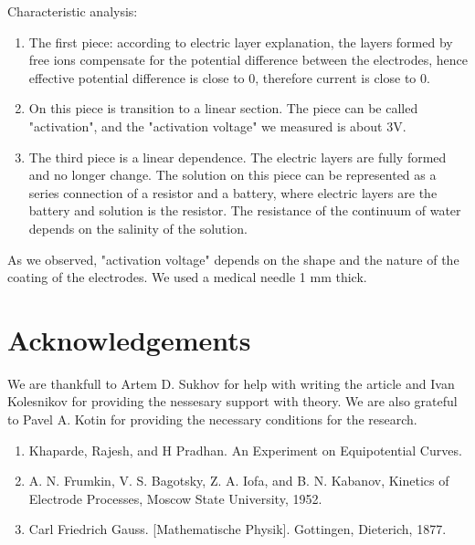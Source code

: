 \documentclass{article}
\begin{document}
Characteristic analysis:
\begin{enumerate}   
\item The first piece: according to electric layer explanation, the layers formed by free ions compensate for the potential difference between the electrodes, hence effective potential difference is close to 0, therefore current is close to 0.

\item On this piece is transition to a linear section. The piece can be called "activation", and the "activation voltage" we measured is about 3V.

\item The third piece is a linear dependence. The electric layers are fully formed and no longer change. The solution on this piece can be represented as a series connection of a resistor and a battery, where electric layers are the battery and solution is the resistor. The resistance of the continuum of water depends on the salinity of the solution.
\end{enumerate}

As we observed, "activation voltage" depends on the shape and the nature of the coating of the electrodes. We used a medical needle 1 mm thick.


\section{Acknowledgements}
We are thankfull to Artem D. Sukhov for help with writing the article and Ivan Kolesnikov for providing the nessesary support with theory. We are also grateful to Pavel A. Kotin for providing the necessary conditions for the research.



  
  
\begin{enumerate}
\item Khaparde, Rajesh, and H Pradhan. An Experiment on Equipotential Curves.
\item A. N. Frumkin, V. S. Bagotsky, Z. A. Iofa, and B. N. Kabanov, Kinetics of Electrode Processes, Moscow State University, 1952.
\item Carl Friedrich Gauss. [Mathematische Physik]. Gottingen, Dieterich, 1877.

\end{enumerate}
\end{document}
